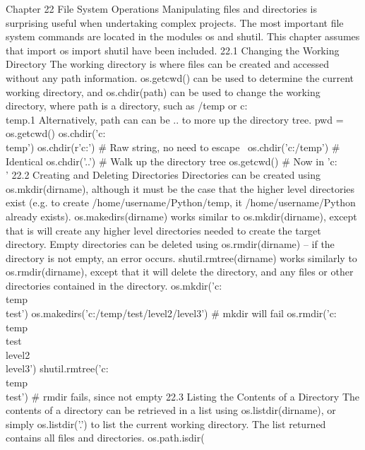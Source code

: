 Chapter 22
File System Operations
Manipulating files and directories is surprising useful when undertaking complex projects. The most important
file system commands are located in the modules os and shutil. This chapter assumes that
import os
import shutil
have been included.
22.1 Changing the Working Directory
The working directory is where files can be created and accessed without any path information. os.getcwd()
can be used to determine the current working directory, and os.chdir(path) can be used to change the
working directory, where path is a directory, such as /temp or c:\\temp.1 Alternatively, path can can be .. to
more up the directory tree.
pwd = os.getcwd()
os.chdir(’c:\\temp’)
os.chdir(r’c:\temp’) # Raw string, no need to escape \
os.chdir(’c:/temp’) # Identical
os.chdir(’..’) # Walk up the directory tree
os.getcwd() # Now in ’c:\\’
22.2 Creating and Deleting Directories
Directories can be created using os.mkdir(dirname), although it must be the case that the higher level directories
exist (e.g. to create /home/username/Python/temp, it /home/username/Python already exists). os.makedirs(dirname)
works similar to os.mkdir(dirname), except that is will create any higher level directories needed to create
the target directory.
Empty directories can be deleted using os.rmdir(dirname) – if the directory is not empty, an error
occurs. shutil.rmtree(dirname) works similarly to os.rmdir(dirname), except that it will delete the directory,
and any files or other directories contained in the directory.
os.mkdir(’c:\\temp\\test’)
os.makedirs(’c:/temp/test/level2/level3’) # mkdir will fail
os.rmdir(’c:\\temp\\test\\level2\\level3’)
shutil.rmtree(’c:\\temp\\test’) # rmdir fails, since not empty
22.3 Listing the Contents of a Directory
The contents of a directory can be retrieved in a list using os.listdir(dirname), or simply os.listdir(’.’)
to list the current working directory. The list returned contains all files and directories. os.path.isdir(
